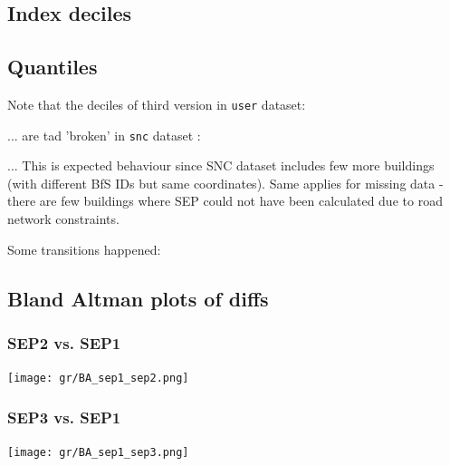 \documentclass[a4paper, notitlepage, fleqn]{article} %
\begin{document}
\subsection{Index deciles}
\begin{stlog}\end{stlog}
\subsection{Quantiles}

Note that the deciles of third version in \texttt{user} dataset:
\begin{stlog}\end{stlog}
... are tad 'broken' in \texttt{snc} dataset :
\begin{stlog}\end{stlog}
... This is expected behaviour since SNC dataset includes few more buildings (with different BfS IDs but same coordinates). 
Same applies for missing data - there are few buildings where SEP could not have been calculated due to road network constraints.  
\begin{landscape}
Some transitions happened:  
\begin{stlog}\end{stlog}
\end{landscape}

\subsection{Bland Altman plots of diffs}
\subsubsection{SEP2 vs. SEP1}

\begin{center}
\texttt{[image: gr/BA\_sep1\_sep2.png]} 
\end{center}

\subsubsection{SEP3 vs. SEP1}

\begin{center}
\texttt{[image: gr/BA\_sep1\_sep3.png]} 
\end{center}
\newpage
\end{document}
